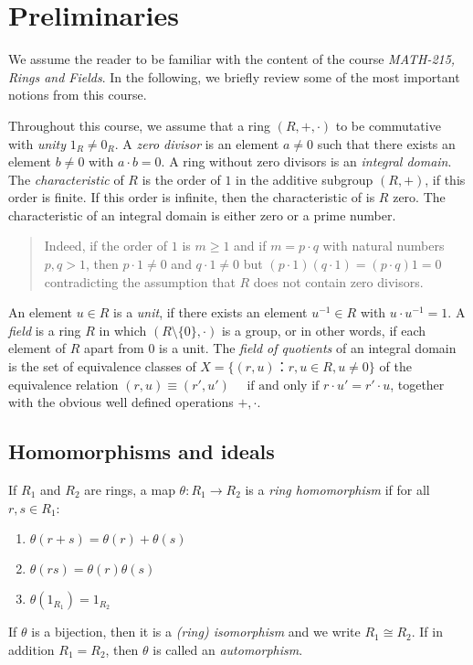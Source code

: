 \chapter{Preliminaries}
\label{cha:preliminaries}


We assume the reader to be familiar with the content of the course \emph{MATH-215, Rings and Fields}. In the following, we briefly review some of the most important notions from this course.

Throughout this course, we assume that a ring $(R,+,⋅)$ to be commutative with \emph{unity}  $1_R \neq 0_R$. A \emph{zero divisor} is an element $a≠0$ such that there exists  an element $b≠0$ with $a⋅b = 0$. A ring without zero divisors is an  \emph{integral domain}. The \emph{characteristic} of $R$ is the order of $1$ in the additive subgroup $(R,+)$, if this order is finite. If this order is infinite, then the characteristic of is $R$ zero. The characteristic of an integral domain is either zero or a prime number.
\begin{quote}
  \small Indeed, if the order of $1$ is $m ≥1$ and if $m = p⋅q$ with natural numbers $p,q >1$, then $ p ⋅1≠ 0$ and   $q ⋅1≠0$ but  $ (p ⋅1 ) (q ⋅1) = (p⋅q) 1 = 0$ contradicting the assumption that $R$ does not contain zero divisors. 
\end{quote}


An element $u ∈ R$ is a  \emph{unit}, if there exists an element $u^{-1} ∈R$ with $u ⋅ u^{-1} = 1$. 
A \emph{field} is a ring $R$ in which $(R \setminus \{0\}, ⋅)$  is a group, or in other words, if each element of $R$ apart from $0$ is a unit. The \emph{field of quotients} of an integral domain is the set of equivalence classes of $X = \{ (r,u) ： r,u ∈R, u ≠0\}$ of the equivalence relation
$  (r,u) ≡ (r',u') \quad \text{ if  and only if } r ⋅ u' = r' ⋅ u$,  together with the obvious well defined operations $+, ⋅$.




\section{Homomorphisms and ideals}
\label{sec:homomorphisms-ideals}


If $R_1$ and $R_2$ are rings, a map  $θ: R_1 → R_2$ is a \emph{ring  homomorphism} if for all $r,s ∈R_1$:
\begin{enumerate}
\item $θ(r+s) = θ(r) + θ(s)$
\item $θ(rs) = θ(r) θ(s)$
\item $θ(1_{R_1}) = 1_{R_2} $ 
\end{enumerate}
If $θ$ is a bijection, then it is a \emph{(ring) isomorphism} and we write $R_1 ≅ R_2$. If in addition $R_1 = R_2$, then $θ$ is called an \emph{automorphism}. 

